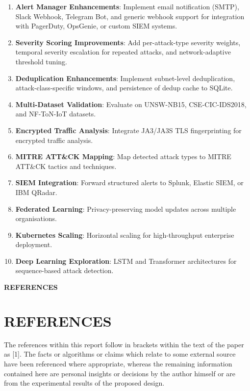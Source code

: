 \documentclass[12pt,a4paper]{report}
\newcommand{\chapterdivider}[1]{%
    \clearpage
    \thispagestyle{empty}
    \vspace*{\fill}
    \begin{center}
        \Huge\bfseries\color{mydarkblue} #1
    \end{center}
    \vspace*{\fill}
    \clearpage
}
\begin{document}
\begin{enumerate}
    \item \textbf{Alert Manager Enhancements}: Implement email notification (SMTP), Slack Webhook, Telegram Bot, and generic webhook support for integration with PagerDuty, OpsGenie, or custom SIEM systems.

    \item \textbf{Severity Scoring Improvements}: Add per-attack-type severity weights, temporal severity escalation for repeated attacks, and network-adaptive threshold tuning.

    \item \textbf{Deduplication Enhancements}: Implement subnet-level deduplication, attack-class-specific windows, and persistence of dedup cache to SQLite.

    \item \textbf{Multi-Dataset Validation}: Evaluate on UNSW-NB15, CSE-CIC-IDS2018, and NF-ToN-IoT datasets.

    \item \textbf{Encrypted Traffic Analysis}: Integrate JA3/JA3S TLS fingerprinting for encrypted traffic analysis.

    \item \textbf{MITRE ATT\&CK Mapping}: Map detected attack types to MITRE ATT\&CK tactics and techniques.

    \item \textbf{SIEM Integration}: Forward structured alerts to Splunk, Elastic SIEM, or IBM QRadar.

    \item \textbf{Federated Learning}: Privacy-preserving model updates across multiple organisations.

    \item \textbf{Kubernetes Scaling}: Horizontal scaling for high-throughput enterprise deployment.

    \item \textbf{Deep Learning Exploration}: LSTM and Transformer architectures for sequence-based attack detection.
\end{enumerate}

\chapterdivider{REFERENCES}

\chapter{REFERENCES}

The references within this report follow in brackets within the text of the paper as [1]. The facts or algorithms or claims which relate to some external source have been referenced where appropriate, whereas the remaining information contained here are personal insights or decisions by the author himself or are from the experimental results of the proposed design.
\end{document}
